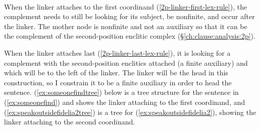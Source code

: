 \begin{singlespacing}
\ex \label{2p-linker-first-lex-rule}
\xe

\ex~ \label{2p-linker-last-lex-rule}
\xe
\end{singlespacing}

When the linker attaches to the first coordinand (\ref{2p-linker-first-lex-rule}), the complement needs to still be looking for its subject, be nonfinite, and occur after the linker. The mother node is nonfinite and not an auxiliary so that it can be the complement of the second-position enclitic complex (\S\ref{ch:clause:analysis:2p}).

When the linker attaches last (\ref{2p-linker-last-lex-rule}), it is looking for a complement with the second-position enclitics attached (a finite auxiliary) and which will be to the left of the linker. The linker will be the head in this construction, so I constrain it to be a finite auxiliary in order to head the sentence. (\ref{ex:someonefindtree}) below is a tree structure for the sentence in (\ref{ex:someonefind}) and shows the linker attaching to the first coordinand, and (\ref{ex:speakoutsidefidelia2tree}) is a tree for (\ref{ex:speakoutsidefidelia2}), showing the linker attaching to the second coordinand.

